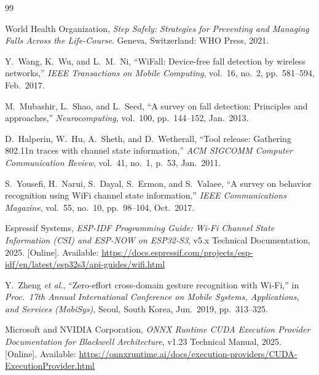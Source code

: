 \documentclass{hcmut-report}
\begin{document}
\begin{thebibliography}{99}

World Health Organization, \emph{Step Safely: Strategies for Preventing and Managing Falls Across the Life-Course}. Geneva, Switzerland: WHO Press, 2021.

Y.~Wang, K.~Wu, and L.~M.~Ni, ``WiFall: Device-free fall detection by wireless networks,'' \emph{IEEE Transactions on Mobile Computing}, vol.~16, no.~2, pp.~581--594, Feb.~2017.

M.~Mubashir, L.~Shao, and L.~Seed, ``A survey on fall detection: Principles and approaches,'' \emph{Neurocomputing}, vol.~100, pp.~144--152, Jan.~2013.

D.~Halperin, W.~Hu, A.~Sheth, and D.~Wetherall, ``Tool release: Gathering 802.11n traces with channel state information,'' \emph{ACM SIGCOMM Computer Communication Review}, vol.~41, no.~1, p.~53, Jan.~2011.

S.~Yousefi, H.~Narui, S.~Dayal, S.~Ermon, and S.~Valaee, ``A survey on behavior recognition using WiFi channel state information,'' \emph{IEEE Communications Magazine}, vol.~55, no.~10, pp.~98--104, Oct.~2017.

Espressif Systems, \emph{ESP-IDF Programming Guide: Wi-Fi Channel State Information (CSI) and ESP-NOW on ESP32-S3}, v5.x Technical Documentation, 2025. [Online]. Available: \url{https://docs.espressif.com/projects/esp-idf/en/latest/esp32s3/api-guides/wifi.html}

Y.~Zheng \emph{et al.}, ``Zero-effort cross-domain gesture recognition with Wi-Fi,'' in \emph{Proc.\ 17th Annual International Conference on Mobile Systems, Applications, and Services (MobiSys)}, Seoul, South Korea, Jun.~2019, pp.~313--325.

Microsoft and NVIDIA Corporation, \emph{ONNX Runtime CUDA Execution Provider Documentation for Blackwell Architecture}, v1.23 Technical Manual, 2025. [Online]. Available: \url{https://onnxruntime.ai/docs/execution-providers/CUDA-ExecutionProvider.html}

\end{thebibliography}

\newpage
\appendix
\end{document}
